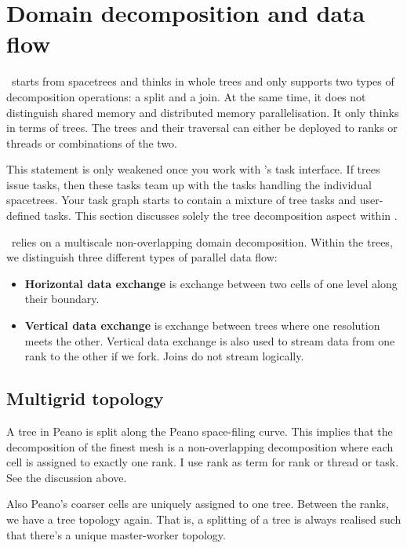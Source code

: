 \chapter{Domain decomposition and data flow}
\label{section:design:domain-decomposition}

\Peano\ starts from spacetrees and thinks in whole trees and only supports two
types of decomposition operations: a split and a join.
At the same time, it does not distinguish shared memory and distributed memory
parallelisation.
It only thinks in terms of trees.
The trees and their traversal can either be deployed to ranks or threads or
combinations of the two.


This statement is only weakened once you work with \Peano's task interface. 
If trees issue tasks, then these tasks team up with the tasks handling the
individual spacetrees.
Your task graph starts to contain a mixture of tree tasks and user-defined
tasks.
This section discusses solely the tree decomposition aspect within \Peano.


\Peano\ relies on a multiscale non-overlapping domain decomposition. 
Within the trees, we distinguish three different types of parallel data flow:
\begin{itemize}
  \item {\bf Horizontal data exchange} is exchange between two cells of one
  level along their boundary.
  \item {\bf Vertical data exchange} is exchange between trees where one
  resolution meets the other. Vertical data exchange is also used to stream
  data from one rank to the other if we fork. Joins do not stream logically.
\end{itemize}



\section{Multigrid topology}

A tree in Peano is split along the Peano space-filing curve.
This implies that the decomposition of the finest mesh is a non-overlapping
decomposition where each cell is assigned to exactly one rank.
I use rank as term for rank or thread or task. 
See the discussion above.


Also Peano's coarser cells are uniquely assigned to one tree. 
Between the ranks, we have a tree topology again. 
That is, a splitting of a tree is always realised such that there's a unique
master-worker topology.

